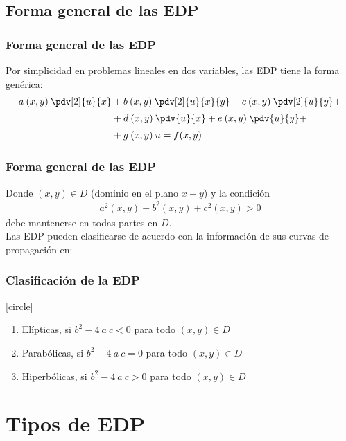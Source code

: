 \subsection{Forma general de las EDP}
\begin{frame}
\frametitle{Forma general de las EDP}
Por simplicidad en problemas lineales en dos variables, las EDP tiene la forma genérica:
\begin{align*}
a \: (x, y) \: \pdv[2]{u}{x} &+ b \: (x, y) \: \pdv[2]{u}{x}{y} + c \: (x, y) \: \pdv[2]{u}{y} + \\[0.25em]
&+ d \: (x, y) \: \pdv{u}{x} + e \: (x, y) \: \pdv{u}{y} + \\[0.25em]
&+ g \: (x, y) \: u = f(x, y)
\end{align*}
\end{frame}
\begin{frame}
\frametitle{Forma general de las EDP}
Donde $(x, y) \in D$ (dominio en el plano $x-y$) y la condición
\begin{align*}
a^{2} (x, y) + b^{2} (x, y) + c^{2} (x, y)> 0
\end{align*}
debe mantenerse en todas partes en $D$.
\\
\bigskip
Las EDP pueden clasificarse de acuerdo con la información de sus curvas de propagación en:
\end{frame}
\begin{frame}
\frametitle{Clasificación de la EDP}
[circle]
\begin{enumerate}[<+->]
\item Elípticas, si $b^{2} - 4 \: a\: c < 0$ para todo $(x,y) \in D$
\item Parabólicas, si $b^{2} - 4 \: a \: c = 0$ para todo $(x,y) \in D$
\item Hiperbólicas, si $b^{2} - 4 \: a \: c > 0$ para todo $(x,y) \in D$
\end{enumerate}
\end{frame}
\section{Tipos de EDP}
